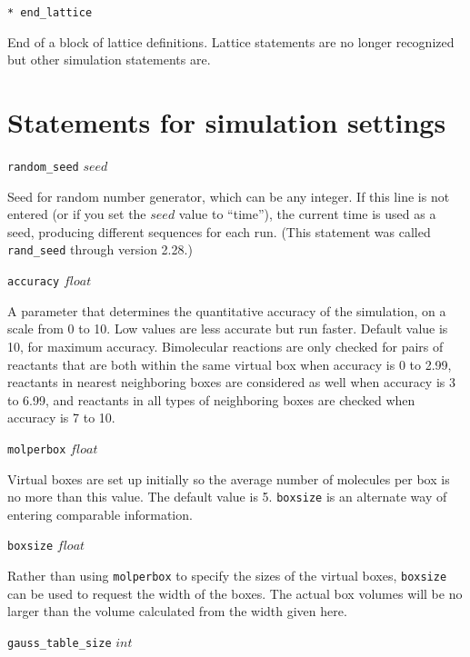 \documentclass {scrbook}
\newcommand {\ttt} {\texttt}
\begin{document}
\begin{description}
\item{\ttt{* end\_lattice}}

End of a block of lattice definitions. Lattice statements are no longer recognized but other simulation statements are.

\end{description}

\section{Statements for simulation settings}

\begin{description}

\item{\ttt{random\_seed} $seed$}

Seed for random number generator, which can be any integer. If this line is not entered (or if you set the $seed$ value to ``time''), the current time is used as a seed, producing different sequences for each run. (This statement was called \ttt{rand\_seed} through version 2.28.)

\item{\ttt{accuracy} $float$}

A parameter that determines the quantitative accuracy of the simulation, on a scale from 0 to 10. Low values are less accurate but run faster. Default value is 10, for maximum accuracy. Bimolecular reactions are only checked for pairs of reactants that are both within the same virtual box when accuracy is 0 to 2.99, reactants in nearest neighboring boxes are considered as well when accuracy is 3 to 6.99, and reactants in all types of neighboring boxes are checked when accuracy is 7 to 10.

\item{\ttt{molperbox} $float$}

Virtual boxes are set up initially so the average number of molecules per box is no more than this value. The default value is 5. \ttt{boxsize} is an alternate way of entering comparable information.

\item{\ttt{boxsize} $float$}

Rather than using \ttt{molperbox} to specify the sizes of the virtual boxes, \ttt{boxsize} can be used to request the width of the boxes. The actual box volumes will be no larger than the volume calculated from the width given here.

\item{\ttt{gauss\_table\_size} $int$}


\end{description}
\end{document}
